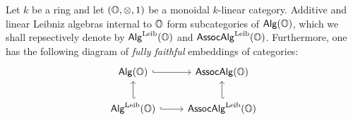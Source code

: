                 \begin{proposition} \label{prop: leibniz_algebra_categories}
                    Let $k$ be a ring and let $(\O, \tensor, 1)$ be a monoidal $k$-linear category. Additive and linear Leibniz algebras internal to $\mathbb{O}$ form subcategories of $\mathsf{Alg}(\mathbb{O})$, which we shall repsectively denote by $\mathsf{Alg}^{\mathrm{Leib}}(\mathbb{O})$ and $\mathsf{Assoc}\mathsf{Alg}^{\mathrm{Leib}}(\mathbb{O})$. Furthermore, one has the following diagram of \textit{fully faithful} embeddings of categories:
                        $$
                            \begin{tikzcd}
                            	{\Alg(\O)} & {\Assoc\Alg(\O)} \\
                            	{\Alg^{\Leib}(\O)} & {\Assoc\Alg^{\Leib}(\O)}
                            	\arrow[hook', from=2-1, to=1-1]
                            	\arrow[hook', from=2-2, to=1-2]
                            	\arrow[hook, from=2-1, to=2-2]
                            	\arrow[hook, from=1-1, to=1-2]
                            \end{tikzcd}
                        $$
                \end{proposition}
